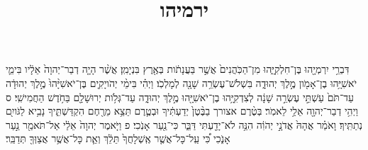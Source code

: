 \documentclass{openreader}
\title{ירמיהו}
\date{}
\begin{document}
\maketitle
\raggedbottom 
\fontsize{16pt}{24pt}\selectfont


דִּבְרֵ֥י יִרְמְיָ֖הוּ בֶּן־חִלְקִיָּ֑הוּ מִן־הַכֹּֽהֲנִים֙ אֲשֶׁ֣ר בַּעֲנָתֹ֔ות בְּאֶ֖רֶץ בִּנְיָמִֽן׃ 
אֲשֶׁ֨ר הָיָ֤ה דְבַר־יְהוָה֙ אֵלָ֔יו בִּימֵ֛י יֹאשִׁיָּ֥הוּ בֶן־אָמֹ֖ון מֶ֣לֶךְ יְהוּדָ֑ה בִּשְׁלֹשׁ־עֶשְׂרֵ֥ה שָׁנָ֖ה לְמָלְכֹֽו׃ 
וַיְהִ֗י בִּימֵ֨י יְהֹויָקִ֤ים בֶּן־יֹאשִׁיָּ֨הוּ֙ מֶ֣לֶךְ יְהוּדָ֔ה עַד־תֹּם֙ עַשְׁתֵּ֣י עֶשְׂרֵ֣ה שָׁנָ֔ה לְצִדְקִיָּ֥הוּ בֶן־יֹאשִׁיָּ֖הוּ מֶ֣לֶךְ יְהוּדָ֑ה עַד־גְּלֹ֥ות יְרוּשָׁלִַ֖ם בַּחֹ֥דֶשׁ הַחֲמִישִֽׁי׃ ס 
וַיְהִ֥י דְבַר־יְהוָ֖ה אֵלַ֥י לֵאמֹֽר׃ 
בְּטֶ֨רֶם אצורך בַבֶּ֨טֶן֙ יְדַעְתִּ֔יךָ וּבְטֶ֛רֶם תֵּצֵ֥א מֵרֶ֖חֶם הִקְדַּשְׁתִּ֑יךָ נָבִ֥יא לַגֹּויִ֖ם נְתַתִּֽיךָ׃ 
וָאֹמַ֗ר אֲהָהּ֙ אֲדֹנָ֣י יְהֹוִ֔ה הִנֵּ֥ה לֹא־יָדַ֖עְתִּי דַּבֵּ֑ר כִּי־נַ֖עַר אָנֹֽכִי׃ פ 
וַיֹּ֤אמֶר יְהוָה֙ אֵלַ֔י אַל־תֹּאמַ֖ר נַ֣עַר אָנֹ֑כִי כִּ֠י עַֽל־כָּל־אֲשֶׁ֤ר אֶֽשְׁלָחֲךָ֙ תֵּלֵ֔ךְ וְאֵ֛ת כָּל־אֲשֶׁ֥ר אֲצַוְּךָ֖ תְּדַבֵּֽר׃ 
\end{document}
